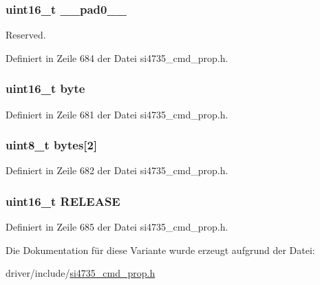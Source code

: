 \subsubsection[{\+\_\+\+\_\+pad0\+\_\+\+\_\+}]{\setlength{\rightskip}{0pt plus 5cm}uint16\+\_\+t \+\_\+\+\_\+pad0\+\_\+\+\_\+}\label{unionfm__soft__mute__rel__rate_a77132c2c26a75f5b8751b235cda23828}


Reserved. 



Definiert in Zeile 684 der Datei si4735\+\_\+cmd\+\_\+prop.\+h.

\hypertarget{unionfm__soft__mute__rel__rate_ab0549c1b5ea980a02e7eab77e21fea49}{}
\subsubsection[{byte}]{\setlength{\rightskip}{0pt plus 5cm}uint16\+\_\+t byte}\label{unionfm__soft__mute__rel__rate_ab0549c1b5ea980a02e7eab77e21fea49}


Definiert in Zeile 681 der Datei si4735\+\_\+cmd\+\_\+prop.\+h.

\hypertarget{unionfm__soft__mute__rel__rate_a46e4c05d20a047ec169f60d3167e912e}{}
\subsubsection[{bytes}]{\setlength{\rightskip}{0pt plus 5cm}uint8\+\_\+t bytes\mbox{[}2\mbox{]}}\label{unionfm__soft__mute__rel__rate_a46e4c05d20a047ec169f60d3167e912e}


Definiert in Zeile 682 der Datei si4735\+\_\+cmd\+\_\+prop.\+h.

\hypertarget{unionfm__soft__mute__rel__rate_a11e93d50103a9c890a961d4571dae3b9}{}
\subsubsection[{R\+E\+L\+E\+A\+S\+E}]{\setlength{\rightskip}{0pt plus 5cm}uint16\+\_\+t R\+E\+L\+E\+A\+S\+E}\label{unionfm__soft__mute__rel__rate_a11e93d50103a9c890a961d4571dae3b9}


Definiert in Zeile 685 der Datei si4735\+\_\+cmd\+\_\+prop.\+h.



Die Dokumentation für diese Variante wurde erzeugt aufgrund der Datei\+:\begin{DoxyCompactItemize}
\item 
driver/include/\hyperlink{si4735__cmd__prop_8h}{si4735\+\_\+cmd\+\_\+prop.\+h}\end{DoxyCompactItemize}
